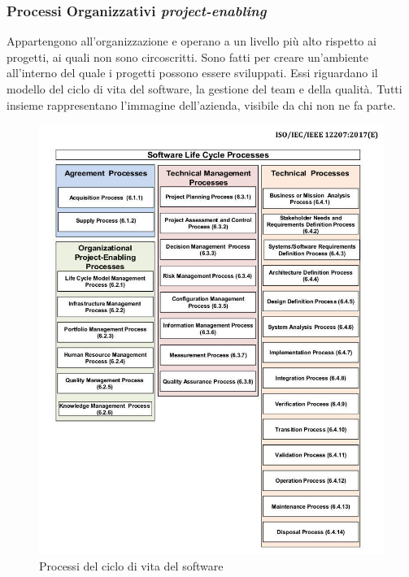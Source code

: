 		\subsubsection{Processi Organizzativi \textit{project-enabling}}
		Appartengono all'organizzazione e operano a un livello più alto rispetto ai progetti, ai quali non sono circoscritti. Sono fatti per creare un'ambiente all'interno del quale i progetti possono essere sviluppati. Essi riguardano il modello del ciclo di vita del software, la gestione del team e della qualità. Tutti insieme rappresentano l'immagine dell'azienda, visibile da chi non ne fa parte.
		
		\begin{figure}
			\centering
			\includegraphics[scale=0.5]{res/images/software_life_cycle_processes.jpg}
			\caption{Processi del ciclo di vita del software}	
		\end{figure}
	
